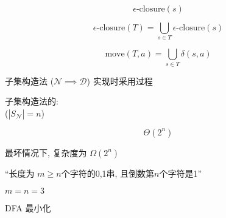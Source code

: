 \begin{frame}{}
  \[
    \epsilon\text{-closure}(s)
  \]

  \pause
  \vspace{0.60cm}
  \[
    \epsilon\text{-closure}(T) = \bigcup_{s \in T} \epsilon\text{-closure}(s)
  \]

  \pause
  \vspace{0.60cm}
  \[
    \text{move}(T, a) = \bigcup_{s \in T} \delta(s, a)
  \]
\end{frame}

\begin{frame}{}
  \begin{center}
    子集构造法 ($\mathcal{N} \implies \mathcal{D}$) 实现时采用过程


  \end{center}
\end{frame}

\begin{frame}{}
  \begin{center}
    子集构造法的: \\
    ($|S_{\mathcal{N}}| = n$)

    \[
      \Theta(2^n)
    \]

    \pause
    \vspace{0.30cm}
    最坏情况下, 复杂度为 $\Omega(2^n)$

    \pause
    \vspace{0.50cm}
    ``长度为 $m \ge n$个字符的0,1串, 且倒数第$n$个字符是1''

    \pause
    \vspace{0.80cm}
     $m = n = 3$
  \end{center}
\end{frame}

\begin{frame}{}

  \vspace{0.30cm}
  \begin{center}
    DFA 最小化
  \end{center}
\end{frame}

